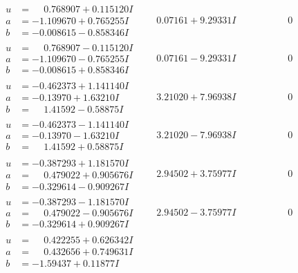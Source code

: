 \documentclass[1p]{elsarticle_modified}
\theoremstyle{definition}
\begin{document}
$$\begin{array}{c|c|c}
\begin{aligned}
u &= \phantom{-}0.768907 + 0.115120 I \\
a &= -1.109670 + 0.765255 I \\
b &= -0.008615 - 0.858346 I\end{aligned}
 & \phantom{-}0.07161 + 9.29331 I & \phantom{-0.000000 } 0 \\ \hline\begin{aligned}
u &= \phantom{-}0.768907 - 0.115120 I \\
a &= -1.109670 - 0.765255 I \\
b &= -0.008615 + 0.858346 I\end{aligned}
 & \phantom{-}0.07161 - 9.29331 I & \phantom{-0.000000 } 0 \\ \hline\begin{aligned}
u &= -0.462373 + 1.141140 I \\
a &= -0.13970 + 1.63210 I \\
b &= \phantom{-}1.41592 - 0.58875 I\end{aligned}
 & \phantom{-}3.21020 + 7.96938 I & \phantom{-0.000000 } 0 \\ \hline\begin{aligned}
u &= -0.462373 - 1.141140 I \\
a &= -0.13970 - 1.63210 I \\
b &= \phantom{-}1.41592 + 0.58875 I\end{aligned}
 & \phantom{-}3.21020 - 7.96938 I & \phantom{-0.000000 } 0 \\ \hline\begin{aligned}
u &= -0.387293 + 1.181570 I \\
a &= \phantom{-}0.479022 + 0.905676 I \\
b &= -0.329614 - 0.909267 I\end{aligned}
 & \phantom{-}2.94502 + 3.75977 I & \phantom{-0.000000 } 0 \\ \hline\begin{aligned}
u &= -0.387293 - 1.181570 I \\
a &= \phantom{-}0.479022 - 0.905676 I \\
b &= -0.329614 + 0.909267 I\end{aligned}
 & \phantom{-}2.94502 - 3.75977 I & \phantom{-0.000000 } 0 \\ \hline\begin{aligned}
u &= \phantom{-}0.422255 + 0.626342 I \\
a &= \phantom{-}0.432656 + 0.749631 I \\
b &= -1.59437 + 0.11877 I\end{aligned}

\end{array}$$
\end{document}
